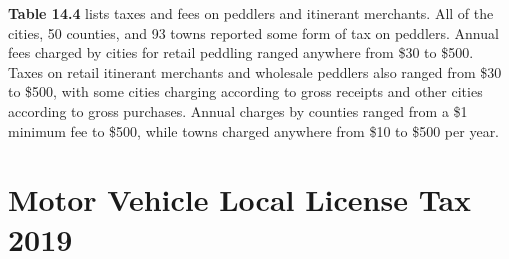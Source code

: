 \documentclass[
]{book}
\newenvironment{Shaded}{\begin{snugshade}}{\end{snugshade}}
\newcommand{\CommentTok}[1]{\textcolor[rgb]{0.56,0.35,0.01}{\textit{#1}}}
\begin{document}
\textbf{Table 14.4} lists taxes and fees on peddlers and itinerant merchants. All of the cities, 50 counties, and 93 towns reported some form of tax on peddlers. Annual fees charged by cities for retail peddling ranged anywhere from \$30 to \$500. Taxes on retail itinerant merchants and wholesale peddlers also ranged from \$30 to \$500, with some cities charging according to gross receipts and other cities according to gross purchases. Annual charges by counties ranged from a \$1 minimum fee to \$500, while towns charged anywhere from \$10 to \$500 per year.

\begin{Shaded}
\end{Shaded}

\hypertarget{motor-vehicle-local-license-tax-2019}{%
\chapter{Motor Vehicle Local License Tax 2019}\label{motor-vehicle-local-license-tax-2019}}
\end{document}
